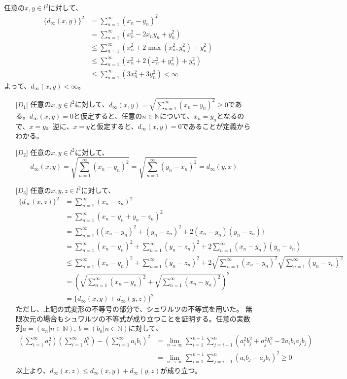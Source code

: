 \documentclass{jsarticle}
\begin{document}
\subsection{}
任意の$x,y\in l^2$に対して、
\begin{align*}
\{d_\infty(x,y)\}^2&=\sum_{n=1}^\infty (x_n-y_n)^2\\
&=\sum_{n=1}^\infty ( x_n^2 -2x_n y_n +y_n^2 )\\
&\leq \sum_{n=1}^\infty ( x_n^2 +2 \max(x_n^2, y_n^2) +y_n^2 )\\
&\leq \sum_{n=1}^\infty ( x_n^2 +2(x_n^2+ y_n^2) +y_n^2 )\\
&\leq \sum_{n=1}^\infty ( 3x_n^2 +3y_n^2 ) < \infty
\end{align*}
よって、$d_\infty(x,y)<\infty$。


\begin{enumerate}
\item[{[$D_1$]}] 
任意の$x,y\in l^2$に対して、$d_\infty(x,y)=\sqrt{\sum_{n=1}^\infty (x_n-y_n)^2}\geq 0$である。$d_\infty(x,y)= 0$と仮定すると、任意の$n\in\mathbb{N}$について、$x_n=y_n$となるので、$x=y$。逆に、$x=y$と仮定すると、$d_\infty(x,y)= 0$であることが定義からわかる。
\item[{[$D_2$]}]
任意の$x,y\in l^2$に対して、
\[d_\infty(x,y)=\sqrt{\sum_{n=1}^\infty (x_n-y_n)^2}=\sqrt{\sum_{n=1}^\infty (y_n-x_n)^2}=d_\infty(y,x)\]
\item[{[$D_3$]}]
任意の$x,y,z\in l^2$に対して、
\begin{align*}
\{d_\infty(x,z)\}^2&=\sum_{n=1}^\infty (x_n-z_n)^2\\
&=\sum_{n=1}^\infty (x_n-y_n+y_n-z_n)^2\\
&=\sum_{n=1}^\infty \{(x_n-y_n)^2+(y_n-z_n)^2+2(x_n-y_n)(y_n-z_n)\}\\
&=\sum_{n=1}^\infty (x_n-y_n)^2+  \sum_{n=1}^\infty (y_n-z_n)^2+ 2\sum_{n=1}^\infty (x_n-y_n)(y_n-z_n)\\
&\leq\sum_{n=1}^\infty (x_n-y_n)^2+  \sum_{n=1}^\infty (y_n-z_n)^2+ 2 \sqrt{\sum_{n=1}^\infty(x_n-y_n)^2}\sqrt{\sum_{n=1}^\infty(y_n-z_n)^2}\\
&=(\sqrt{\sum_{n=1}^\infty (x_n-y_n)^2}+\sqrt{\sum_{n=1}^\infty (x_n-y_n)^2})^2\\
&=\{d_\infty(x,y)+d_\infty(y,z)\}^2
\end{align*}
ただし、上記の式変形の不等号の部分で、シュワルツの不等式を用いた。
無限次元の場合もシュワルツの不等式が成り立つことを証明する。任意の実数列$a=(a_n|n\in\mathbb{N}),\ b=(b_n|n\in\mathbb{N})$に対して、
\begin{align*}
(\sum_{i=1}^{\infty}a_i^2)(\sum_{i=1}^{\infty}b_i^2)-(\sum_{i=1}^{\infty}a_i b_i)^2&=
\lim_{n\to\infty}\sum_{i=1}^{n-1}\sum_{j=i+1}^n (a_i^2b_j^2+a_j^2b_i^2-2a_ib_ia_jb_j)\\
&=\lim_{n\to\infty}\sum_{i=1}^{n-1}\sum_{j=i+1}^n (a_ib_j-a_jb_i)^2\geq 0
\end{align*}
以上より、$d_\infty(x,z)\leq d_\infty(x,y)+d_\infty(y,z)$が成り立つ。
\end{enumerate}
\end{document}
